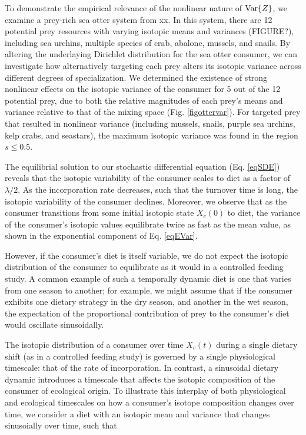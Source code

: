 \documentclass{frontiersSCNS}
\begin{document}
To demonstrate the empirical relevance of the nonlinear nature of ${\rm Var}\{Z\}$, we examine a prey-rich sea otter system from xx.
In this system, there are 12 potential prey resources with varying isotopic means and variances (FIGURE?), including sea urchins, multiple species of crab, abalone, mussels, and snails.
By altering the underlaying Dirichlet distribution for the sea otter consumer, we can investigate how alternatively targeting each prey alters its isotopic variance across different degrees of specialization.
We determined the existence of strong nonlinear effects on the isotopic variance of the consumer for 5 out of the 12 potential prey, due to both the relative magnitudes of each prey's means and variance relative to that of the mixing space (Fig. \ref{figottervar}).
For targeted prey that resulted in nonlinear variance (including mussels, snails, purple sea urchins, kelp crabs, and seastars), the maximum isotopic variance was found in the region $s \leq 0.5$.


The equilibrial solution to our stochastic differential equation (Eq. \ref{eqSDE}) reveals that the isotopic variability of the consumer scales to diet as a factor of $\lambda/2$.
As the incorporation rate decreases, such that the turnover time is long, the isotopic variability of the consumer declines.
Moreover, we observe that as the consumer transitions from some initial isotopic state $X_c(0)$ to diet, the variance of the consumer's isotopic values equilibrate twice as fast as the mean value, as shown in the exponential component of Eq. \ref{eqEVar}.







However, if the consumer's diet is itself variable, we do not expect the isotopic distribution of the consumer to equilibrate as it would in a controlled feeding study.
A common example of such a temporally dynamic diet is one that varies from one season to another; for example, we might assume that if the consumer exhibits one dietary strategy in the dry season, and another in the wet season, the expectation of the proportional contribution of prey to the consumer's diet would oscillate sinusoidally.

The isotopic distribution of a consumer over time $X_c(t)$ during a single dietary shift (as in a controlled feeding study) is governed by a single physiological timescale: that of the rate of incorporation.
In contrast, a sinusoidal dietary dynamic introduces a timescale that affects the isotopic composition of the consumer of ecological origin.
To illustrate this interplay of both physiological and ecological timescales on how a consumer's isotope composition changes over time, we consider a diet with an isotopic mean and variance that changes sinusoially over time, such that
\end{document}
